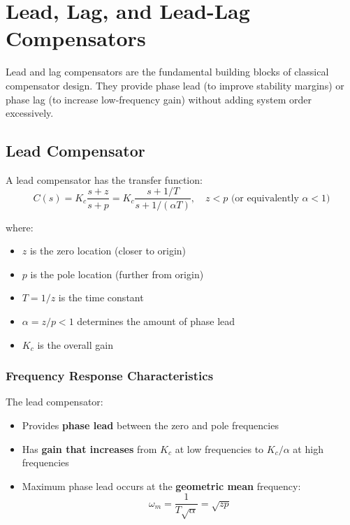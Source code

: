 \section{Lead, Lag, and Lead-Lag Compensators}
\label{sec:compensators}

Lead and lag compensators are the fundamental building blocks of classical compensator design. They provide phase lead (to improve stability margins) or phase lag (to increase low-frequency gain) without adding system order excessively.

\subsection{Lead Compensator}
\label{subsec:lead_compensator}

A lead compensator has the transfer function:
\begin{equation}
\boxed{C(s) = K_c \frac{s + z}{s + p} = K_c \frac{s + 1/T}{s + 1/(\alpha T)}, \quad z < p \text{ (or equivalently } \alpha < 1\text{)}}
\label{eq:lead_compensator}
\end{equation}

where:
\begin{itemize}
    \item $z$ is the zero location (closer to origin)
    \item $p$ is the pole location (further from origin)
    \item $T = 1/z$ is the time constant
    \item $\alpha = z/p < 1$ determines the amount of phase lead
    \item $K_c$ is the overall gain
\end{itemize}

\subsubsection{Frequency Response Characteristics}

The lead compensator:
\begin{itemize}
    \item Provides \textbf{phase lead} between the zero and pole frequencies
    \item Has \textbf{gain that increases} from $K_c$ at low frequencies to $K_c/\alpha$ at high frequencies
    \item Maximum phase lead occurs at the \textbf{geometric mean} frequency:
    \begin{equation}
    \omega_m = \frac{1}{T\sqrt{\alpha}} = \sqrt{zp}
    \end{equation}
\end{itemize}

